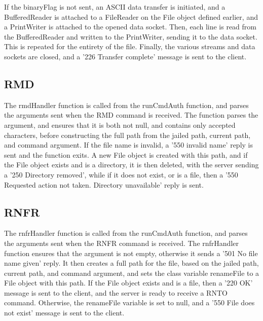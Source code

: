 \documentclass[11pt,a4paper,titlepage]{article}
\begin{document}
If the binaryFlag is not sent, an ASCII data transfer is initiated, and a BufferedReader is attached to a FileReader on the File object defined earlier, and a PrintWriter is attached to the opened data socket. Then, each line is read from the BufferedReader and written to the PrintWriter, sending it to the data socket. This is repeated for the entirety of the file. Finally, the various streams and data sockets are closed, and a '226 Transfer complete' message is sent to the client.

\subsection{RMD}
The rmdHandler function is called from the runCmdAuth function, and parses the arguments sent when the RMD command is received. The function parses the argument, and ensures that it is both not null, and contains only accepted characters, before constructing the full path from the jailed path, current path, and command argument. If the file name is invalid, a '550 invalid name' reply is sent and the function exits. A new File object is created with this path, and if the File object exists and is a directory, it is then deleted, with the server sending a '250 Directory removed', while if it does not exist, or is a file, then a '550 Requested action not taken. Directory unavailable' reply is sent.

\subsection{RNFR}
The rnfrHandler function is called from the runCmdAuth function, and parses the arguments sent when the RNFR command is received. The rnfrHandler function ensures that the argument is not empty, otherwise it sends a '501 No file name given' reply. It then creates a full path for the file, based on the jailed path, current path, and command argument, and sets the class variable renameFile to a File object with this path. If the File object exists and is a file, then a '220 OK' message is sent to the client, and the server is ready to receive a RNTO command. Otherwise, the renameFile variable is set to null, and a '550 File does not exist' message is sent to the client.
\end{document}
